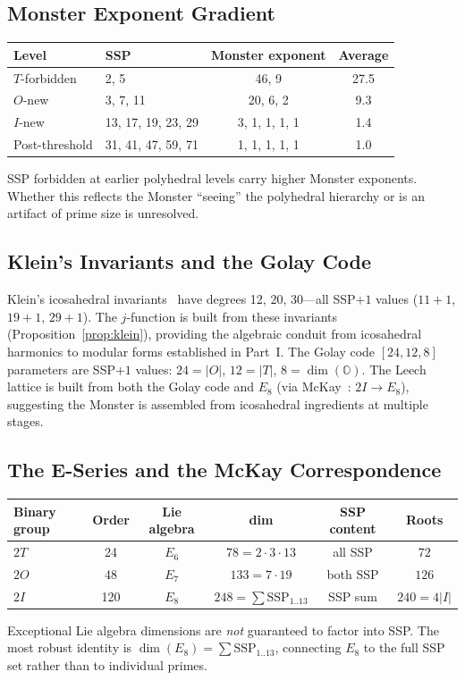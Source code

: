 \documentclass[11pt,letterpaper]{article}
\theoremstyle{definition}
\newcommand{\SSP}{\mathrm{SSP}}
\newcommand{\OO}{\mathbb{O}}
\newcommand{\abs}[1]{\lvert #1 \rvert}
\begin{document}
\subsection{Monster Exponent Gradient}
\begin{center}
\begin{tabular}{llcc}
\toprule
Level & SSP & Monster exponent & Average \\
\midrule
$T$-forbidden & 2, 5 & 46, 9 & 27.5 \\
$O$-new & 3, 7, 11 & 20, 6, 2 & 9.3 \\
$I$-new & 13, 17, 19, 23, 29 & 3, 1, 1, 1, 1 & 1.4 \\
Post-threshold & 31, 41, 47, 59, 71 & 1, 1, 1, 1, 1 & 1.0 \\
\bottomrule
\end{tabular}
\end{center}
SSP forbidden at earlier polyhedral levels carry higher Monster exponents.  Whether this reflects the Monster ``seeing'' the polyhedral hierarchy or is an artifact of prime size is unresolved.
\subsection{Klein's Invariants and the Golay Code}
Klein's icosahedral invariants~\cite{Klein1884} have degrees 12, 20, 30---all SSP${+}1$ values ($11{+}1$, $19{+}1$, $29{+}1$).  The $j$-function is built from these invariants (Proposition~\ref{prop:klein}), providing the algebraic conduit from icosahedral harmonics to modular forms established in Part~I.
The Golay code $[24,12,8]$ parameters are SSP${+}1$ values: $24=\abs{O}$, $12=\abs{T}$, $8=\dim(\OO)$.  The Leech lattice is built from both the Golay code and $E_8$ (via McKay~\cite{McKay1980}: $2I\to E_8$), suggesting the Monster is assembled from icosahedral ingredients at multiple stages.
\subsection{The E-Series and the McKay Correspondence}\label{sec:eseries}
\begin{center}
\begin{tabular}{lccccc}
\toprule
Binary group & Order & Lie algebra & dim & SSP content & Roots \\
\midrule
$2T$ & 24 & $E_6$ & $78=2{\cdot}3{\cdot}13$ & all SSP & $72$ \\
$2O$ & 48 & $E_7$ & $133=7{\cdot}19$ & both SSP & $126$ \\
$2I$ & 120 & $E_8$ & $248=\sum\SSP_{1..13}$ & SSP sum & $240=4\abs{I}$ \\
\bottomrule
\end{tabular}
\end{center}
Exceptional Lie algebra dimensions are \emph{not} guaranteed to factor into SSP.  The most robust identity is $\dim(E_8)=\sum\SSP_{1..13}$, connecting $E_8$ to the full SSP set rather than to individual primes.
\end{document}
